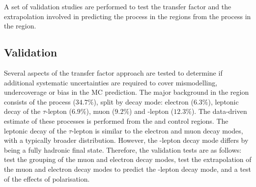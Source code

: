 A set of validation studies are performed to test the transfer factor and the extrapolation involved in predicting the \IWj process in the \metplusjets regions from the \IWj process in the \ellplusjets region.


\subsection{Validation}

Several aspects of the transfer factor approach are tested to determine if additional systematic uncertainties are required to cover mismodelling, undercoverage or bias in the MC prediction. The major background in the \metplusjets region consists of the \IWj process ($34.7\%$), split by decay mode: electron ($6.3\%$), leptonic decay of the $\tau$-lepton ($6.9\%$), muon ($9.2\%$) and \Ptauh-lepton ($12.3\%$). The data-driven estimate of these processes is performed from the \muplusjets and \eleplusjets control regions.  The leptonic decay of the $\tau$-lepton is similar to the electron and muon decay modes, with a typically broader \recoil distribution. However, the \Ptauh-lepton decay mode differs by being a fully hadronic final state.  Therefore, the validation tests are as follows: test the grouping of the muon and electron decay modes, test the extrapolation of the muon and electron decay modes to predict the \Ptauh-lepton decay mode, and a test of the effects of \PW polarisation.

